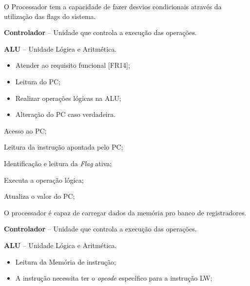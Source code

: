 \documentclass{article}
\begin{document}
  O Processador tem a capacidade de fazer desvios condicionais atrav\'{e}s da utilização das flags do sistema.
  \actors
    \begin{description}
     \item \textbf{Controlador} – Unidade que controla a execução das operações.
     \item \textbf{ALU} – Unidade L\'{o}gica e Aritm\'{e}tica.
    \end{description}
    
  \preconditions 
    \begin{itemize}
     \item Atender ao requisito funcional [FR14];
     \item Leitura do PC;
     \item Realizar operações lógicas na ALU;
    \end{itemize}

  \postconditions
    \begin{itemize}
     \item Alteração do PC caso verdadeira.
    \end{itemize}
  
  
  \begin{mainflow}
    \item Acesso ao PC;
    \item Leitura da instrução apontada pelo PC;
    \item Identificação e leitura da \textit{Flag} ativa;
    \item Executa a operação lógica;
    \item Atualiza o valor do PC;
  \end{mainflow}
  
  O processador é capaz de carregar dados da memória pro banco de registradores.
  \actors
    \begin{description}
     \item \textbf{Controlador} – Unidade que controla a execução das operações.
     \item \textbf{ALU} – Unidade L\'{o}gica e Aritm\'{e}tica.
    \end{description}
    
  \preconditions 
    \begin{itemize}
     \item Leitura da Memória de instrução;
     \item A instrução necessita ter o \textit{opcode} específico para a instrução LW;
    \end{itemize}
\end{document}
